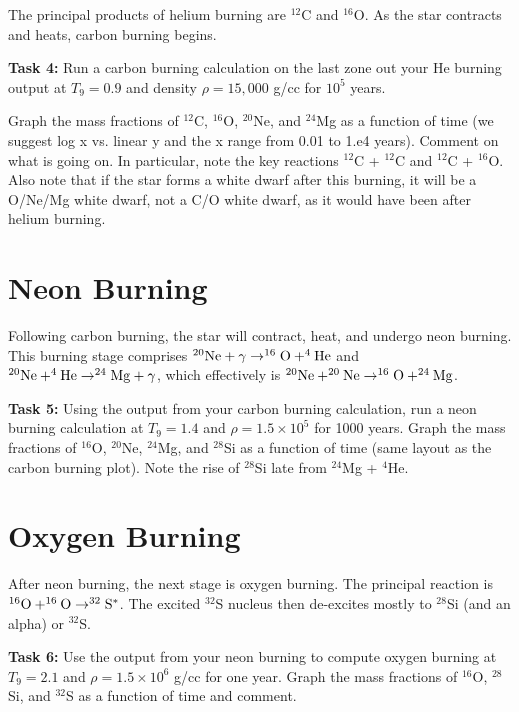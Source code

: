 \documentclass[manuscript]{aastex62}
\begin{document}
The principal products of helium burning are $^{12}$C and $^{16}$O.  As the
star contracts and heats, carbon burning begins.

{\bf Task 4:}
Run a carbon burning calculation on the last zone out your He burning output
at $T_9 = 0.9$ and density
$\rho = 15,000$ g/cc for $10^5$ years.

Graph the mass fractions of $^{12}$C,
$^{16}$O, $^{20}$Ne, and $^{24}$Mg as a function of time (we suggest log x vs.
linear y and the x range from 0.01 to 1.e4 years).  Comment on what is going
on.  In particular, note the key reactions $^{12}$C + $^{12}$C and $^{12}$C +
$^{16}$O.  Also note that if the star forms a white dwarf after this burning,
it will be a O/Ne/Mg white dwarf, not a C/O white dwarf, as it would have
been after helium burning.

\section{Neon Burning} \label{sec:Ne}

Following carbon burning, the star will contract, heat, and undergo neon
burning.  This burning stage comprises $^{20}{\rm Ne} + \gamma \to ^{16}{\rm O}
+ ^4{\rm He}$ and $^{20}{\rm Ne} + ^4{\rm He} \to ^{24}{\rm Mg} + \gamma$,
which effectively is $^{20}{\rm Ne} + ^{20}{\rm Ne} \to ^{16}{\rm O} +
^{24}{\rm Mg}$.

{\bf Task 5:}
Using the output from your carbon burning calculation, run a neon burning
calculation at $T_9 = 1.4$ and $\rho = 1.5 \times 10^5$ for 1000 years.
Graph the mass fractions of $^{16}$O, $^{20}$Ne, $^{24}$Mg, and $^{28}$Si
as a function of time (same layout as the carbon burning plot).  Note
the rise of $^{28}$Si late from $^{24}$Mg + $^4$He.

\section{Oxygen Burning} \label{sec:O}

After neon burning, the next stage is oxygen burning.  The principal reaction
is $^{16}{\rm O} + ^{16}{\rm O} \to ^{32}{\rm S}^*$.  The excited $^{32}$S
nucleus then de-excites mostly to $^{28}$Si (and an alpha)
or $^{32}$S.

{\bf Task 6:}  Use the output from your neon burning to compute oxygen burning
at $T_9 = 2.1$ and $\rho = 1.5\times 10^6$ g/cc for one year.  Graph the
mass fractions of $^{16}$O, $^{28}$Si, and $^{32}$S as a function of time and
comment.
\end{document}
